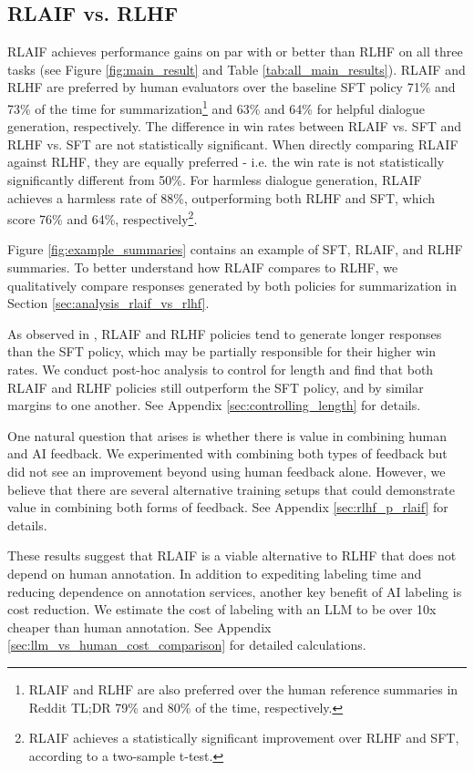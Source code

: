 \documentclass[11pt]{article}
\begin{document}
\subsection{RLAIF vs. RLHF}
\label{sec:rlaif_vs_rlhf}

RLAIF achieves performance gains on par with or better than RLHF on all three tasks (see Figure \ref{fig:main_result} and Table \ref{tab:all_main_results}). RLAIF and RLHF are preferred by human evaluators over the baseline SFT policy 71\% and 73\% of the time for summarization\footnote{RLAIF and RLHF are also preferred over the human reference summaries in Reddit TL;DR 79\% and 80\% of the time, respectively.} and 63\% and 64\% for helpful dialogue generation, respectively. The difference in win rates between RLAIF vs. SFT and RLHF vs. SFT are not statistically significant. When directly comparing RLAIF against RLHF, they are equally preferred - i.e. the win rate is not statistically significantly different from 50\%. For harmless dialogue generation, RLAIF achieves a harmless rate of 88\%, outperforming both RLHF and SFT, which score 76\% and 64\%, respectively\footnote{RLAIF achieves a statistically significant improvement over RLHF and SFT, according to a two-sample t-test.}.

Figure \ref{fig:example_summaries} contains an example of SFT, RLAIF, and RLHF summaries. To better understand how RLAIF compares to RLHF, we qualitatively compare responses generated by both policies for summarization in Section \ref{sec:analysis_rlaif_vs_rlhf}.

As observed in \citet{stiennon2020learning}, RLAIF and RLHF policies tend to generate longer responses than the SFT policy, which may be partially responsible for their higher win rates. We conduct post-hoc analysis to control for length and find that both RLAIF and RLHF policies still outperform the SFT policy, and by similar margins to one another. See Appendix \ref{sec:controlling_length} for details. 

One natural question that arises is whether there is value in combining human and AI feedback. We experimented with combining both types of feedback but did not see an improvement beyond using human feedback alone. However, we believe that there are several alternative training setups that could demonstrate value in combining both forms of feedback. See Appendix \ref{sec:rlhf_p_rlaif} for details.

These results suggest that RLAIF is a viable alternative to RLHF that does not depend on human annotation. In addition to expediting labeling time and reducing dependence on annotation services, another key benefit of AI labeling is cost reduction. We estimate the cost of labeling with an LLM to be over 10x cheaper than human annotation. See Appendix \ref{sec:llm_vs_human_cost_comparison} for detailed calculations.
\end{document}
